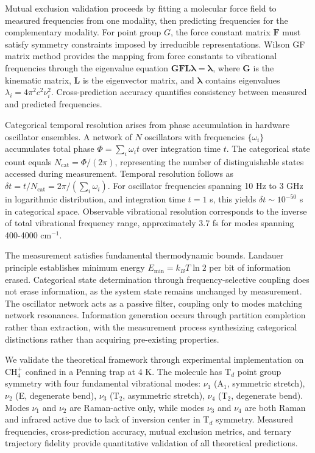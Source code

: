 \documentclass[twocolumn,10pt]{article}
\begin{document}
Mutual exclusion validation proceeds by fitting a molecular force field to measured frequencies from one modality, then predicting frequencies for the complementary modality. For point group $G$, the force constant matrix $\mathbf{F}$ must satisfy symmetry constraints imposed by irreducible representations. Wilson GF matrix method provides the mapping from force constants to vibrational frequencies through the eigenvalue equation $\mathbf{GFL}\boldsymbol{\lambda} = \boldsymbol{\lambda}$, where $\mathbf{G}$ is the kinematic matrix, $\mathbf{L}$ is the eigenvector matrix, and $\boldsymbol{\lambda}$ contains eigenvalues $\lambda_i = 4\pi^2 c^2 \nu_i^2$. Cross-prediction accuracy quantifies consistency between measured and predicted frequencies.

Categorical temporal resolution arises from phase accumulation in hardware oscillator ensembles. A network of $N$ oscillators with frequencies $\{\omega_i\}$ accumulates total phase $\Phi = \sum_i \omega_i t$ over integration time $t$. The categorical state count equals $N_{\text{cat}} = \Phi/(2\pi)$, representing the number of distinguishable states accessed during measurement. Temporal resolution follows as $\delta t = t/N_{\text{cat}} = 2\pi/(\sum_i \omega_i)$. For oscillator frequencies spanning 10 Hz to 3 GHz in logarithmic distribution, and integration time $t = 1$ s, this yields $\delta t \sim 10^{-50}$ s in categorical space. Observable vibrational resolution corresponds to the inverse of total vibrational frequency range, approximately 3.7 fs for modes spanning 400-4000 cm$^{-1}$.

The measurement satisfies fundamental thermodynamic bounds. Landauer principle establishes minimum energy $E_{\min} = k_B T \ln 2$ per bit of information erased. Categorical state determination through frequency-selective coupling does not erase information, as the system state remains unchanged by measurement. The oscillator network acts as a passive filter, coupling only to modes matching network resonances. Information generation occurs through partition completion rather than extraction, with the measurement process synthesizing categorical distinctions rather than acquiring pre-existing properties.

We validate the theoretical framework through experimental implementation on CH$_4^+$ confined in a Penning trap at 4 K. The molecule has T$_d$ point group symmetry with four fundamental vibrational modes: $\nu_1$ (A$_1$, symmetric stretch), $\nu_2$ (E, degenerate bend), $\nu_3$ (T$_2$, asymmetric stretch), $\nu_4$ (T$_2$, degenerate bend). Modes $\nu_1$ and $\nu_2$ are Raman-active only, while modes $\nu_3$ and $\nu_4$ are both Raman and infrared active due to lack of inversion center in T$_d$ symmetry. Measured frequencies, cross-prediction accuracy, mutual exclusion metrics, and ternary trajectory fidelity provide quantitative validation of all theoretical predictions.
\end{document}
